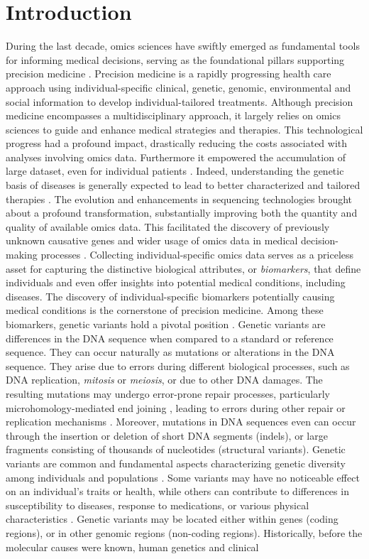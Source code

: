 \documentclass[a4paper, titlepage, openright]{book}
\newcommand{\mychapter}[2]{
    \setcounter{chapter}{#1}
    \setcounter{section}{0}
    \chapter*{#2}
    \addcontentsline{toc}{chapter}{#2}
}
\begin{document}
\mychapter{1}{Introduction}
During the last decade, omics sciences have swiftly emerged as fundamental tools for informing medical decisions, serving as the foundational pillars supporting precision medicine \citep{ginsburg2009genomic}. Precision medicine is a rapidly progressing health care approach using individual-specific clinical, genetic, genomic, environmental and social information \citep{ginsburg2009genomic} to develop individual-tailored treatments. Although precision medicine encompasses a multidisciplinary approach, it largely relies on omics sciences to guide and enhance medical strategies and therapies. This technological progress had a profound impact, drastically reducing the costs associated with analyses involving omics data. Furthermore it empowered the accumulation of large dataset, even for individual patients \citep{voelkerding2009next}. Indeed, understanding the genetic basis of diseases is generally expected to lead to better characterized and tailored therapies \citep{ashley2016towards}. The evolution and enhancements in sequencing technologies brought about a profound transformation, substantially improving both the quantity and quality of available omics data. This facilitated the discovery of previously unknown causative genes \citep{ng2009targeted} and wider usage of omics data in medical decision-making processes \citep{ashley2010clinical, worthey2011making}. Collecting individual-specific omics data serves as a priceless asset for capturing the distinctive biological attributes, or \emph{biomarkers}, that define individuals and even offer insights into potential medical conditions, including diseases. The discovery of individual-specific biomarkers potentially causing medical conditions is the cornerstone of precision medicine. Among these biomarkers, genetic variants hold a pivotal position \citep{raphael2014identifying}. Genetic variants are differences in the DNA sequence when compared to a standard or reference sequence. They can occur naturally as mutations or alterations in the DNA sequence. They arise due to errors during different biological processes, such as DNA replication, \emph{mitosis} or \emph{meiosis}, or due to other DNA damages. The resulting mutations may undergo error-prone repair processes, particularly microhomology-mediated end joining \citep{sinha2017microhomology, seol2018microhomology}, leading to errors during other repair or replication mechanisms \citep{rodgers2016error}. Moreover, mutations in DNA sequences even can occur through the insertion or deletion of short DNA segments (indels), or large fragments consisting of thousands of nucleotides (structural variants). Genetic variants are common and fundamental aspects characterizing genetic diversity among individuals and populations \citep{siva20081000}. Some variants may have no noticeable effect on an individual's traits or health, while others can contribute to differences in susceptibility to diseases, response to medications, or various physical characteristics \citep{bodmer2008common, ingelman2018integrating, mitchell2007evolutionary}. Genetic variants may be located either within genes (coding regions), or in other genomic regions (non-coding regions). Historically, before the molecular causes were known, human genetics and clinical 
\end{document}
